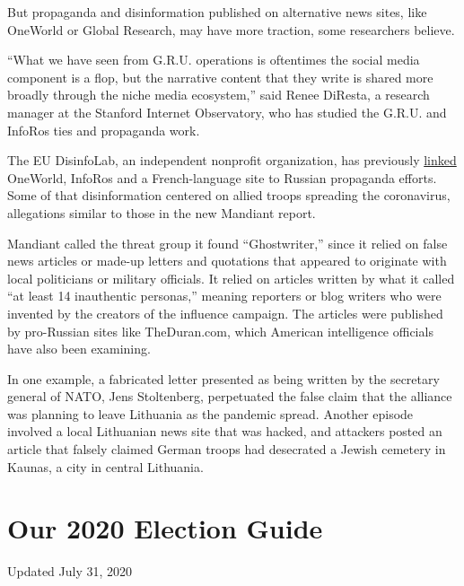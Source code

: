 But propaganda and disinformation published on alternative news sites,
like OneWorld or Global Research, may have more traction, some
researchers believe.

``What we have seen from G.R.U. operations is oftentimes the social
media component is a flop, but the narrative content that they write is
shared more broadly through the niche media ecosystem,'' said Renee
DiResta, a research manager at the Stanford Internet Observatory, who
has studied the G.R.U. and InfoRos ties and propaganda work.

The EU DisinfoLab, an independent nonprofit organization, has previously
\href{https://www.disinfo.eu/publications/how-two-information-portals-hide-their-ties-to-the-russian-news-agency-inforos/}{linked}
OneWorld, InfoRos and a French-language site to Russian propaganda
efforts. Some of that disinformation centered on allied troops spreading
the coronavirus, allegations similar to those in the new Mandiant
report.

Mandiant called the threat group it found ``Ghostwriter,'' since it
relied on false news articles or made-up letters and quotations that
appeared to originate with local politicians or military officials. It
relied on articles written by what it called ``at least 14 inauthentic
personas,'' meaning reporters or blog writers who were invented by the
creators of the influence campaign. The articles were published by
pro-Russian sites like TheDuran.com, which American intelligence
officials have also been examining.

In one example, a fabricated letter presented as being written by the
secretary general of NATO, Jens Stoltenberg, perpetuated the false claim
that the alliance was planning to leave Lithuania as the pandemic
spread. Another episode involved a local Lithuanian news site that was
hacked, and attackers posted an article that falsely claimed German
troops had desecrated a Jewish cemetery in Kaunas, a city in central
Lithuania.

\hypertarget{our-2020-election-guide}{%
\section{Our 2020 Election Guide}\label{our-2020-election-guide}}

Updated July 31, 2020

